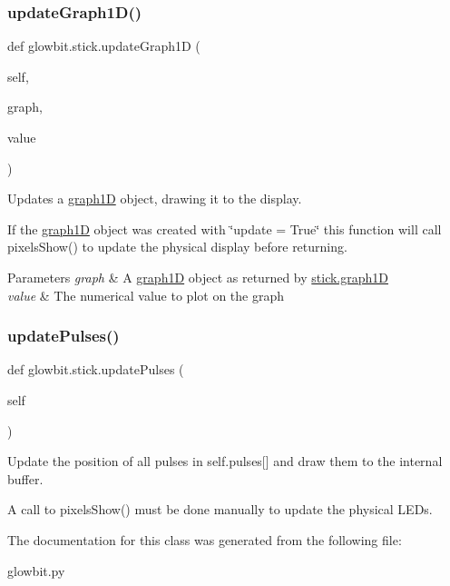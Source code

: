 \subsubsection{\texorpdfstring{update\+Graph1\+D()}{updateGraph1D()}}
{\footnotesize\ttfamily def glowbit.\+stick.\+update\+Graph1D (\begin{DoxyParamCaption}\item[{}]{self,  }\item[{}]{graph,  }\item[{}]{value }\end{DoxyParamCaption})}



Updates a \hyperlink{classglowbit_1_1stick_1_1graph1D}{graph1D} object, drawing it to the display. 

If the \hyperlink{classglowbit_1_1stick_1_1graph1D}{graph1D} object was created with \char`\"{}update = True\char`\"{} this function will call pixels\+Show() to update the physical display before returning.


\begin{DoxyParams}{Parameters}
{\em graph} & A \hyperlink{classglowbit_1_1stick_1_1graph1D}{graph1D} object as returned by \hyperlink{classglowbit_1_1stick_1_1graph1D}{stick.\+graph1D} \\
\hline
{\em value} & The numerical value to plot on the graph \\
\hline
\end{DoxyParams}
\mbox{\label{classglowbit_1_1stick_a84e72d81b9c96b1acb268b730866a8ea}} 
\subsubsection{\texorpdfstring{update\+Pulses()}{updatePulses()}}
{\footnotesize\ttfamily def glowbit.\+stick.\+update\+Pulses (\begin{DoxyParamCaption}\item[{}]{self }\end{DoxyParamCaption})}



Update the position of all pulses in self.\+pulses\mbox{[}\mbox{]} and draw them to the internal buffer. 

A call to pixels\+Show() must be done manually to update the physical L\+E\+Ds. 

The documentation for this class was generated from the following file\+:\begin{DoxyCompactItemize}
\item 
glowbit.\+py\end{DoxyCompactItemize}
